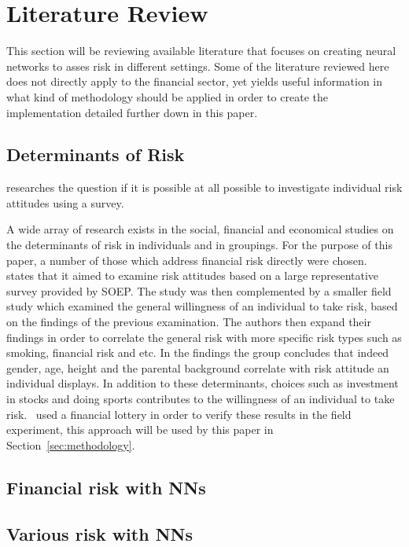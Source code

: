 \documentclass{article}
\begin{document}
\section{Literature Review}
\label{sec:literature_review}
This section will be reviewing available literature that focuses on creating neural networks to asses risk in different settings. Some of the literature reviewed here does not directly apply to the financial sector, yet yields useful information in what kind of methodology should be applied in order to create the implementation detailed further down in this paper.

\subsection{Determinants of Risk}
\label{sub:determinants_riks}

\cite{dp4807.pdf} researches the question if it is possible at all possible to investigate individual risk attitudes using a survey.

A wide array of research exists in the social, financial and economical studies on the determinants of risk in individuals and in groupings. For the purpose of this paper, a number of those which address financial risk directly were chosen.~\cite{individualRiskAttitudes} states that it aimed to examine risk attitudes based on a large representative survey provided by SOEP\@. The study was then complemented by a smaller field study which examined the general willingness of an individual to take risk, based on the findings of the previous examination. The authors then expand their findings in order to correlate the general risk with more specific risk types such as smoking, financial risk and etc. In the findings the group concludes that indeed gender, age, height and the parental background correlate with risk attitude an individual displays. In addition to these determinants, choices such as investment in stocks and doing sports contributes to the willingness of an individual to take risk.~\cite{individualRiskAttitudes} used a financial lottery in order to verify these results in the field experiment, this approach will be used by this paper in Section~\ref{sec:methodology}.

\subsection{Financial risk with NNs}
\label{sub:financial_risk_nn}


\subsection{Various risk with NNs}
\label{sub:various_risk_nn}
\end{document}
